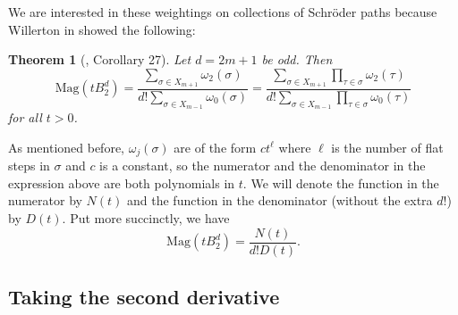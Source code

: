 \documentclass[11pt]{article}
\theoremstyle{definition}
\theoremstyle{definition}
\theoremstyle{plain}
\newtheorem{theo}{Theorem}
\theoremstyle{plain}
\theoremstyle{plain}
\theoremstyle{definition}
\begin{document}
We are interested in these weightings on collections of Schröder paths because Willerton in \cite{willerton_magnitude_2017} showed the following:

\begin{theo}[\cite{willerton_magnitude_2017}, Corollary 27]
Let $d = 2m+1$ be odd. Then
\begin{equation*}
\text{Mag}\left(tB_2^d\right) = \frac{\sum\limits_{\sigma\in X_{m+1}}\omega_2(\sigma)}{d!\sum\limits_{\sigma\in X_{m-1}}\omega_0(\sigma)} = \frac{\sum\limits_{\sigma\in X_{m+1}}\prod\limits_{\tau\in\sigma}\omega_2(\tau)}{d!\sum\limits_{\sigma\in X_{m-1}}\prod\limits_{\tau\in\sigma}\omega_0(\tau)}
\end{equation*}
for all $t > 0$.
\end{theo}
As mentioned before, $\omega_j(\sigma)$ are of the form $ct^\ell$ where $\ell$ is the number of flat steps in $\sigma$ and $c$ is a constant, so the numerator and the denominator in the expression above are both polynomials in $t$. We will denote the function in the numerator by $N(t)$ and the function in the denominator (without the extra $d!$) by $D(t)$. Put more succinctly, we have
\begin{equation*}
\text{Mag}\left(tB_2^d\right) = \frac{N(t)}{d!D(t)}.
\end{equation*}

\subsection*{Taking the second derivative}
\end{document}
